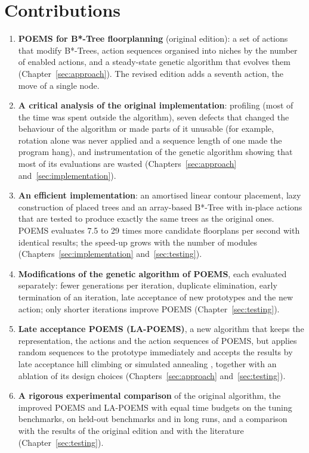 \section{Contributions}

\begin{enumerate}
\item {\bf POEMS for B*-Tree floorplanning} (original edition): a set of actions that modify B*-Trees, action sequences organised into niches by the number of enabled actions, and a steady-state genetic algorithm that evolves them (Chapter~\ref{sec:approach}). The revised edition adds a seventh action, the move of a single node.
\item {\bf A critical analysis of the original implementation}: profiling (most of the time was spent outside the algorithm), seven defects that changed the behaviour of the algorithm or made parts of it unusable (for example, rotation alone was never applied and a sequence length of one made the program hang), and instrumentation of the genetic algorithm showing that most of its evaluations are wasted (Chapters~\ref{sec:approach} and~\ref{sec:implementation}).
\item {\bf An efficient implementation}: an amortised linear contour placement, lazy construction of placed trees and an array-based B*-Tree with in-place actions that are tested to produce exactly the same trees as the original ones. POEMS evaluates 7.5 to 29 times more candidate floorplans per second with identical results; the speed-up grows with the number of modules (Chapters~\ref{sec:implementation} and~\ref{sec:testing}).
\item {\bf Modifications of the genetic algorithm of POEMS}, each evaluated separately: fewer generations per iteration, duplicate elimination, early termination of an iteration, late acceptance of new prototypes and the new action; only shorter iterations improve POEMS (Chapter~\ref{sec:testing}).
\item {\bf Late acceptance POEMS (LA-POEMS)}, a new algorithm that keeps the representation, the actions and the action sequences of POEMS, but applies random sequences to the prototype immediately and accepts the results by late acceptance hill climbing \cite{lahc} or simulated annealing \cite{sa}, together with an ablation of its design choices (Chapters~\ref{sec:approach} and~\ref{sec:testing}).
\item {\bf A rigorous experimental comparison} of the original algorithm, the improved POEMS and LA-POEMS with equal time budgets on the tuning benchmarks, on held-out benchmarks and in long runs, and a comparison with the results of the original edition and with the literature (Chapter~\ref{sec:testing}).
\end{enumerate}

